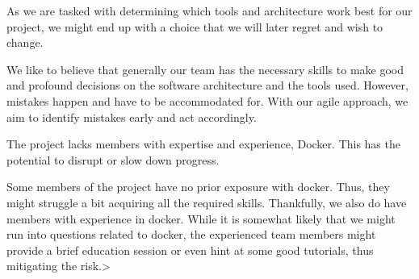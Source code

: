 \documentclass[11pt]{article}
\begin{document}
\begin{tcolorbox}[title=\textbf{Choosing the wrong architecture and tools}, sharp corners, colframe=MaterialOrange600, colback=MaterialOrange100, coltitle=white]
\begin{description}[noitemsep]
\item[Risk:] As we are tasked with determining which tools and architecture work best for our project, we might end up with a choice that we will later regret and wish to change.
\item[Probability:] <2>
\item[Severity:] <2>
\item[Risk exposure:] <4>
\item[Mitigation:] We like to believe that generally our team has the necessary skills to make good and profound decisions on the software architecture and the tools used. However, mistakes happen and have to be accommodated for. With our agile approach, we aim to identify mistakes early and act accordingly.
\end{description}
\end{tcolorbox}

\begin{tcolorbox}[title=\textbf{Lack of knowledge in Docker}, sharp corners, colframe=MaterialOrange600, colback=MaterialOrange100, coltitle=white]
\begin{description}[noitemsep]
\item[Risk:] The project lacks members with expertise and experience, Docker. This has the potential to disrupt or slow down progress.
\item[Probability:] <3>
\item[Severity:] <2>
\item[Risk exposure:] <6>
\item[Mitigation:] Some members of the project have no prior exposure with docker. Thus, they might struggle a bit acquiring all the required skills. Thankfully, we also do have members with experience in docker. While it is somewhat likely that we might run into questions related to docker, the experienced team members might provide a brief education session or even hint at some good tutorials, thus mitigating the risk.>
\end{description}
\end{tcolorbox}
\end{document}

